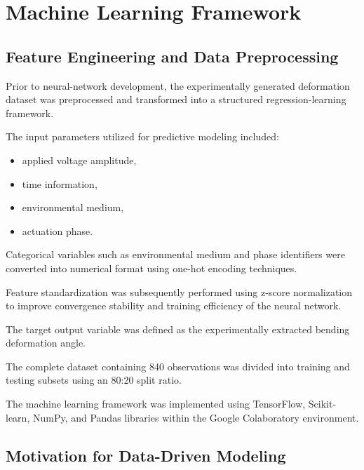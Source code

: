 \documentclass[11pt,a4paper]{article}
\begin{document}

\section{Machine Learning Framework}

\subsection{Feature Engineering and Data Preprocessing}

Prior to neural-network development, the experimentally generated deformation dataset was preprocessed and transformed into a structured regression-learning framework.

The input parameters utilized for predictive modeling included:

\begin{itemize}

\item applied voltage amplitude,

\item time information,

\item environmental medium,

\item actuation phase.

\end{itemize}

Categorical variables such as environmental medium and phase identifiers were converted into numerical format using one-hot encoding techniques.

Feature standardization was subsequently performed using z-score normalization to improve convergence stability and training efficiency of the neural network.

The target output variable was defined as the experimentally extracted bending deformation angle.

The complete dataset containing 840 observations was divided into training and testing subsets using an 80:20 split ratio.

The machine learning framework was implemented using TensorFlow, Scikit-learn, NumPy, and Pandas libraries within the Google Colaboratory environment.

\subsection{Motivation for Data-Driven Modeling}
\end{document}
